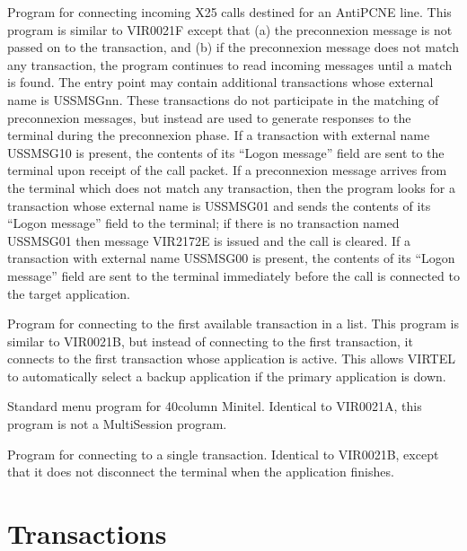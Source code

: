 \documentclass[letterpaper,10pt,english]{sphinxmanual}
\begin{document}
\begin{description}
\sphinxAtStartPar
Program for connecting incoming X25 calls destined for an AntiPCNE line. This program is similar to VIR0021F except that (a) the pre\sphinxhyphen{}connexion message is not passed on to the transaction, and (b) if the pre\sphinxhyphen{}connexion message does not match any transaction, the program continues to read incoming messages until a match is found. The entry point may contain additional transactions whose external name is USSMSGnn. These transactions do not participate in the matching of pre\sphinxhyphen{}connexion messages, but instead are used to generate responses to the terminal during the preconnexion phase. If a transaction with external name USSMSG10 is present, the contents of its “Logon message” field are sent to the terminal upon receipt of the call packet. If a pre\sphinxhyphen{}connexion message arrives from the terminal which does not match any transaction, then the program looks for a transaction whose external name is USSMSG01 and sends the contents of its “Logon message” field to the terminal; if there is no transaction named USSMSG01 then message VIR2172E is issued and the call is cleared. If a transaction with external name USSMSG00 is present, the contents of its “Logon message” field are sent to the terminal immediately before the call is connected to the target application.

\sphinxAtStartPar
Program for connecting to the first available transaction in a list. This program is similar to VIR0021B, but instead of connecting to the first transaction, it connects to the first transaction whose application is active. This allows VIRTEL to automatically select a backup application if the primary application is down.

\sphinxAtStartPar
Standard menu program for 40\sphinxhyphen{}column Minitel. Identical to VIR0021A, this program is not a Multi\sphinxhyphen{}Session program.

\sphinxAtStartPar
Program for connecting to a single transaction. Identical to VIR0021B, except that it does not disconnect the terminal when the application finishes.

\end{description}

\ignorespaces 

\chapter{Transactions}
\label{\detokenize{connectivity_guide:index-115}}\label{\detokenize{connectivity_guide:id62}}
\end{document}
